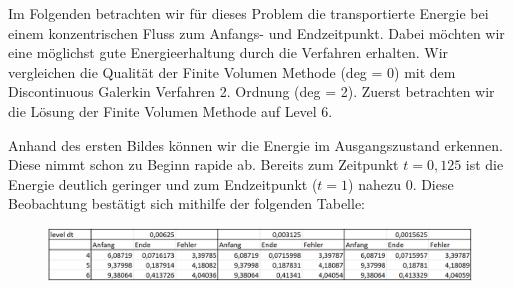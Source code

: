 Im Folgenden betrachten wir für dieses Problem die transportierte Energie bei einem konzentrischen Fluss zum Anfangs- und Endzeitpunkt. Dabei möchten wir eine möglichst gute Energieerhaltung durch die Verfahren erhalten. Wir vergleichen die Qualität der Finite Volumen Methode (deg = 0) mit dem Discontinuous Galerkin Verfahren 2. Ordnung (deg = 2). Zuerst betrachten wir die Lösung der Finite 
Volumen Methode auf Level 6.
\begin{figure}[H]
	\centering
\end{figure}

Anhand des ersten Bildes können wir die Energie im Ausgangszustand erkennen. Diese nimmt schon zu Beginn rapide ab. Bereits zum Zeitpunkt $t = 0,125$ ist die Energie deutlich geringer und zum Endzeitpunkt ($t=1$) nahezu $0$. Diese
Beobachtung bestätigt sich mithilfe der folgenden Tabelle:

\begin{figure}[H]
	\centering
	\includegraphics[width=\textwidth]{../Aufgabe21/deg=0CircleWaveEnergieTabelle.png}
\end{figure}

